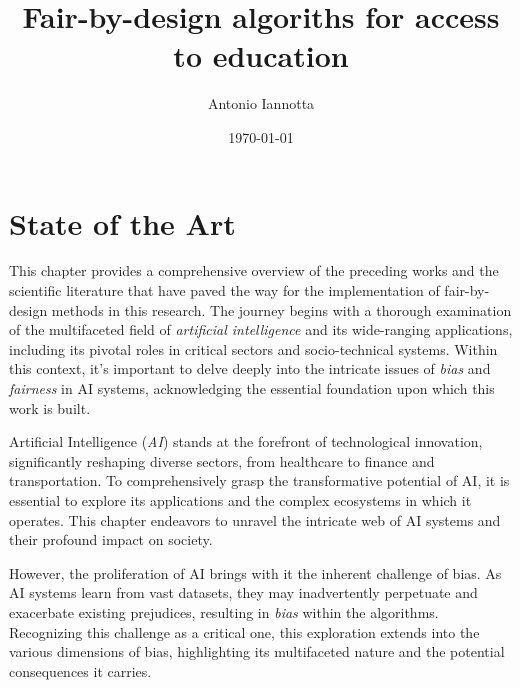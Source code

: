 \documentclass[12pt,a4paper,openright,twoside]{book}
\title{Fair-by-design algoriths for access to education}
\author{Antonio Iannotta}
\date{\today}
\begin{document}
	
\frontmatter







\tableofcontents   

\mainmatter

\chapter{State of the Art} %
\label{chap:background}

This chapter provides a comprehensive overview of the preceding works and the scientific literature that have paved the way for the implementation of fair-by-design methods in this research. The journey begins with a thorough examination of the multifaceted field of \emph{artificial intelligence} and its wide-ranging applications, including its pivotal roles in critical sectors and socio-technical systems. Within this context, it's important to delve deeply into the intricate issues of \emph{bias} and \emph{fairness} in AI systems, acknowledging the essential foundation upon which this work is built. 

Artificial Intelligence (\emph{AI}) stands at the forefront of technological innovation, significantly reshaping diverse sectors, from healthcare to finance and transportation. To comprehensively grasp the transformative potential of AI, it is essential to explore its applications and the complex ecosystems in which it operates. This chapter endeavors to unravel the intricate web of AI systems and their profound impact on society.

However, the proliferation of AI brings with it the inherent challenge of bias. As AI systems learn from vast datasets, they may inadvertently perpetuate and exacerbate existing prejudices, resulting in \emph{bias} within the algorithms. Recognizing this challenge as a critical one, this exploration extends into the various dimensions of bias, highlighting its multifaceted nature and the potential consequences it carries. 
\end{document}
